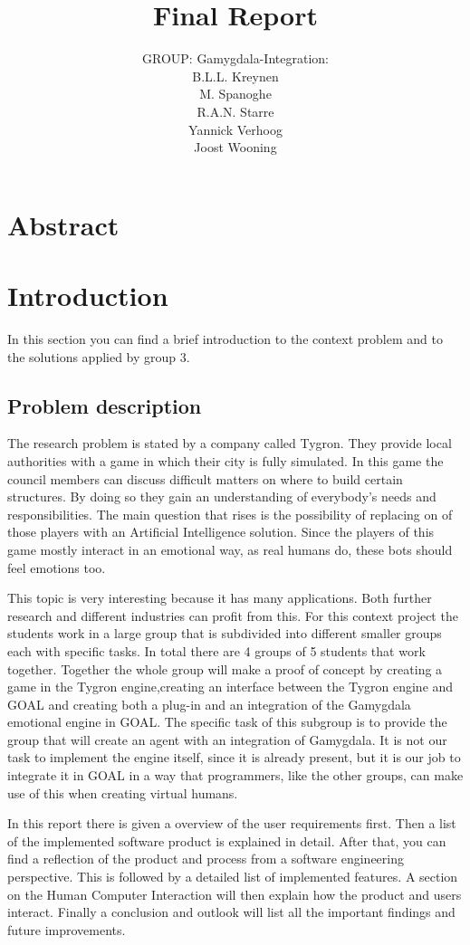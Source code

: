 \documentclass[]{article}
\title{Final Report}
\author{GROUP: Gamygdala-Integration:\\
	B.L.L. Kreynen\\
	M. Spanoghe\\
	R.A.N. Starre\\
	Yannick Verhoog\\
	Joost Wooning\\
	}
\begin{document}
\maketitle
\pagebreak
\tableofcontents
\pagebreak
\section{Abstract}

\section{Introduction}
In this section you can find a brief introduction to the context problem and to the solutions applied by group 3. 
\subsection{Problem description}
The research problem is stated by a company called Tygron. They provide local authorities with a game in which their city is fully simulated. In this game the council members can discuss difficult matters on where to build certain structures. By doing so they gain an understanding of everybody's needs and responsibilities. The main question that rises is the possibility of replacing on of those players with an Artificial Intelligence solution. Since the players of this game mostly interact in an emotional way, as real humans do, these bots should feel emotions too.\par
This topic is very interesting because it has many applications. Both further research and different industries can profit from this.
For this context project the students work in a large group that is subdivided into different smaller groups each with specific tasks. In total there are 4 groups of 5 students that work together. Together the whole group will make a proof of concept by creating a game in the Tygron engine\cite{Tygron},creating an interface between the Tygron engine and \gls{GOAL} and creating both a plug-in and an integration of the \gls{Gamygdala} emotional engine in GOAL. The specific task of this subgroup is to provide the group that will create an agent with an integration of Gamygdala. It is not our task to implement the engine itself, since it is already present, but it is our job to integrate it in GOAL in a way that programmers, like the other groups, can make use of this when creating virtual humans.\par
In this report there is given a overview of the user requirements first. Then a list of the implemented software product is explained in detail. After that, you can find a reflection of the product and process from a software engineering perspective. This is followed by a detailed list of implemented features. A section on the Human Computer Interaction will then explain how the product and users interact. Finally a conclusion and outlook will list all the important findings and future improvements.
\\
\end{document}
